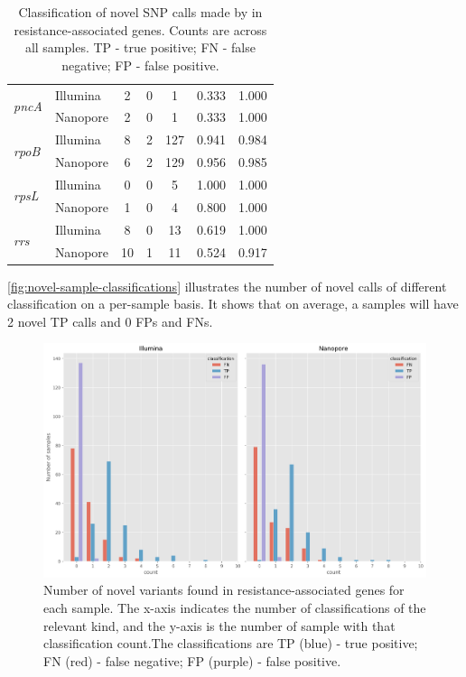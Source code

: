 \begin{table}
\begin{tabular}{|l|l|c|c|c|c|c|}
\multirow{2}{*}{\textit{pncA}}  & Illumina   & 2  & 0  & 1   & 0.333  & 1.000     \\ \cline{2-7} 
                                & Nanopore   & 2  & 0  & 1   & 0.333  & 1.000     \\ \hline
\multirow{2}{*}{\textit{rpoB}}  & Illumina   & 8  & 2  & 127 & 0.941  & 0.984     \\ \cline{2-7} 
                                & Nanopore   & 6  & 2  & 129 & 0.956  & 0.985     \\ \hline
\multirow{2}{*}{\textit{rpsL}}  & Illumina   & 0  & 0  & 5   & 1.000  & 1.000     \\ \cline{2-7} 
                                & Nanopore   & 1  & 0  & 4   & 0.800  & 1.000     \\ \hline
\multirow{2}{*}{\textit{rrs}}   & Illumina   & 8  & 0  & 13  & 0.619  & 1.000     \\ \cline{2-7} 
                                & Nanopore   & 10 & 1  & 11  & 0.524  & 0.917     \\ \hline
\end{tabular}
\caption{Classification of novel SNP calls made by \drprg{} in resistance-associated genes. Counts are across all samples. TP - true positive; FN - false negative; FP - false positive.}
\label{tab:novel-classifications}
\end{table}

\autoref{fig:novel-sample-classifications} illustrates the number of novel calls of different classification on a per-sample basis. It shows that on average, a samples will have 2 novel TP calls and 0 FPs and FNs. 

\begin{figure}
\begin{center}
\includegraphics[width=0.90\columnwidth]{Chapter3/Figs/novel_classifications_per_sample.png}
\caption{{Number of novel variants found in resistance-associated genes for each sample. The x-axis indicates the number of classifications of the relevant kind, and the y-axis is the number of sample with that classification count.The classifications are TP (blue) - true positive; FN (red) - false negative; FP (purple) - false positive.
{\label{fig:novel-sample-classifications}}
}}
\end{center}
\end{figure}

